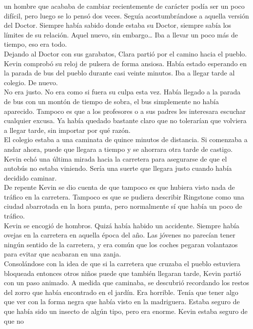 un hombre que acababa de cambiar recientemente de carácter podía ser un
poco difícil, pero luego se lo pensó dos veces. Seguía acostumbrándose a
aquella versión del Doctor. Siempre había sabido donde estaba su Doctor,
siempre sabía los límites de su relación. Aquel nuevo, sin
embargo\ldots{} Iba a llevar un poco más de tiempo, eso era todo.\\
Dejando al Doctor con sus garabatos, Clara partió por el camino hacia el
pueblo.\\[2\baselineskip]Kevin comprobó su reloj de pulsera de forma
ansiosa. Había estado esperando en la parada de bus del pueblo durante
casi veinte minutos. Iba a llegar tarde al colegio. De nuevo. ~\\
No era justo. No era como si fuera su culpa esta vez. Había llegado a la
parada de bus con un montón de tiempo de sobra, el bus simplemente no
había aparecido. Tampoco es que a los profesores o a sus padres les
interesara escuchar cualquier excusa. Ya había quedado bastante claro
que no tolerarían que volviera a llegar tarde, sin importar por qué
razón.\\
El colegio estaba a una caminata de quince minutos de distancia. Si
comenzaba a andar ahora, puede que llegara a tiempo y se ahorrara otra
tarde de castigo.\\
Kevin echó una última mirada hacia la carretera para asegurarse de que
el autobús no estaba viniendo. Sería una suerte que llegara justo cuando
había decidido caminar.\\
De repente Kevin se dio cuenta de que tampoco es que hubiera visto nada
de tráfico en la carretera. Tampoco es que se pudiera describir
Ringstone como una ciudad abarrotada en la hora punta, pero normalmente
sí que había un poco de tráfico.\\
Kevin se encogió de hombros. Quizá había habido un accidente. Siempre
había ovejas en la carretera en aquella época del año. Las jóvenes no
parecían tener ningún sentido de la carretera, y era común que los
coches pegaran volantazos para evitar que acabaran en una zanja.\\
Consolándose con la idea de que si la carretera que cruzaba el pueblo
estuviera bloqueada entonces otros niños puede que también llegaran
tarde, Kevin partió con un paso animado. A medida que caminaba, se
descubrió recordando los restos del zorro que había encontrado en el
jardín. Era horrible. Tenía que tener algo que ver con la forma negra
que había visto en la madriguera. Estaba seguro de que había sido un
insecto de algún tipo, pero era enorme. Kevin estaba seguro de que no
